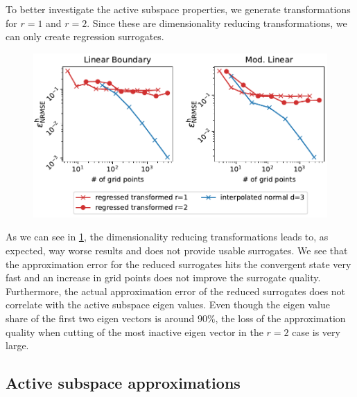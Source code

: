\documentclass[
  a4paper,  %
  twoside,  %
  bibliography=totoc,
  headsepline,
  cleardoublepage=empty,
  parskip=half,
  draft=false
]{scrbook}
\begin{document}
To better investigate the active subspace properties, we generate transformations for $r=1$ and $r=2$.
Since these are dimensionality reducing transformations, we can only create regression surrogates.
\begin{mdframed}[style=style]
\begin{figure}[H]
\includegraphics[width=\textwidth]{graphics/ishigami_red}
\delimit

\label{fig:ishigami_red}
\end{figure}
\end{mdframed}
%
As we can see in \cref{fig:ishigami_red}, the dimensionality reducing transformations leads to, as expected, way worse results and does not provide usable surrogates.
We see that the approximation error for the reduced surrogates hits the convergent state very fast and an increase in grid points does not improve the surrogate quality.
Furthermore, the actual approximation error of the reduced surrogates does not correlate with the active subspace eigen values.
Even though the eigen value share of the first two eigen vectors is around $90\%$, the loss of the approximation quality when cutting of the most inactive eigen vector in the $r=2$ case is very large.

\subsection{Active subspace approximations}
\end{document}
